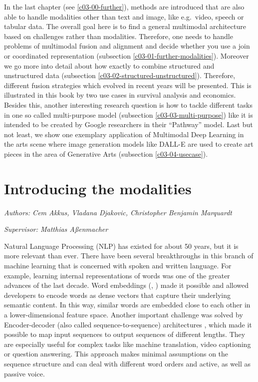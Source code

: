 \documentclass[
]{krantz}
\begin{document}
In the last chapter (see \ref{c03-00-further}), methods are introduced that are also able to handle modalities other than text and image, like e.g.~video, speech or tabular data. The overall goal here is to find a general multimodal architecture based on challenges rather than modalities. Therefore, one needs to handle problems of multimodal fusion and alignment and decide whether you use a join or coordinated representation (subsection \ref{c03-01-further-modalities}). Moreover we go more into detail about how exactly to combine structured and unstructured data (subsection \ref{c03-02-structured-unstructured}). Therefore, different fusion strategies which evolved in recent years will be presented. This is illustrated in this book by two use cases in survival analysis and economics. Besides this, another interesting research question is how to tackle different tasks in one so called multi-purpose model (subsection \ref{c03-03-multi-purpose}) like it is intended to be created by Google researchers \citep{Pathways} in their ``Pathway'' model. Last but not least, we show one exemplary application of Multimodal Deep Learning in the arts scene where image generation models like DALL-E \citep{DALLE} are used to create art pieces in the area of Generative Arts (subsection \ref{c03-04-usecase}).

\hypertarget{c01-00-intro-modalities}{%
\chapter{Introducing the modalities}\label{c01-00-intro-modalities}}

\emph{Authors: Cem Akkus, Vladana Djakovic, Christopher Benjamin Marquardt}

\emph{Supervisor: Matthias Aßenmacher}

Natural Language Processing (NLP) has existed for about 50 years, but it is more relevant than ever. There have been several breakthroughs in this branch of machine learning that is concerned with spoken and written language. For example, learning internal representations of words was one of the greater advances of the last decade. Word embeddings (\citet{Mikolov2013}, \citet{Bojanowski2016}) made it possible and allowed developers to encode words as dense vectors that capture their underlying semantic content. In this way, similar words are embedded close to each other in a lower-dimensional feature space. Another important challenge was solved by Encoder-decoder (also called sequence-to-sequence) architectures \citet{Sutskever2014}, which made it possible to map input sequences to output sequences of different lengths. They are especially useful for complex tasks like machine translation, video captioning or question answering. This approach makes minimal assumptions on the sequence structure and can deal with different word orders and active, as well as passive voice.
\end{document}
